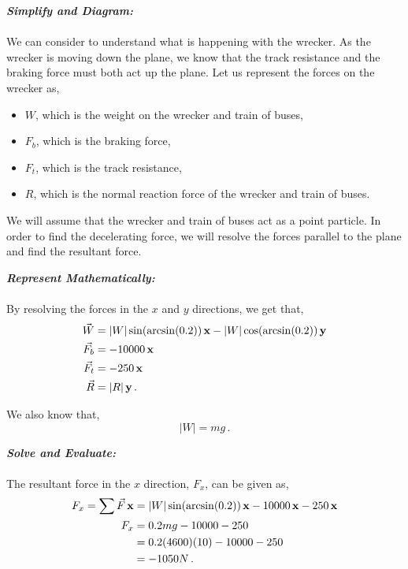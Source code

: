\begin{subquestions}
\begin{subsubquestions}
			\textbf{\textit{Simplify and Diagram:}} \\ \\
			We can consider  to understand what is happening with the wrecker. As the wrecker is moving down the plane, we know that the track resistance and the braking force must both act up the plane. Let us represent the forces on the wrecker as,
			\begin{itemize}
				\item $W$, which is the weight on the wrecker and train of buses,
				\item $F_b$, which is the braking force, 
				\item $F_t$, which is the track resistance,
				\item $R$, which is the normal reaction force of the wrecker and train of buses.
			\end{itemize}
			We will assume that the wrecker and train of buses act as a point particle. In order to find the decelerating force, we will resolve the forces parallel to the plane and find the resultant force.
			
			
			
			
			\textbf{\textit{Represent Mathematically:}} \\ \\
			By resolving the forces in the $x$ and $y$ directions, we get that,
			\begin{align}
				\vec{W} & = |W|\sin(\arcsin(0.2))\,\mathbf{x} - |W|\cos(\arcsin(0.2))\,\mathbf{y} \nonumber \\
				\vec{F_b} & = -10000\,\mathbf{x} \nonumber \\
				\vec{F_t} & = -250\,\mathbf{x} \nonumber \\
				\vec{R} & = |R|\,\mathbf{y} \,.
			\end{align}
			
			We also know that,
			\begin{equation}
				|W|=mg \,.
			\end{equation}
			
			
			
			
			\textbf{\textit{Solve and Evaluate:}} \\ \\
			The resultant force in the $x$ direction, $F_x$, can be given as,
			\begin{align}
				F_x = \sum \vec{F}\,\mathbf{x} & = |W|\sin(\arcsin(0.2))\,\mathbf{x} -10000\,\mathbf{x}-250\,\mathbf{x} \nonumber \\
				F_x & = 0.2mg -10000-250 \nonumber \\
				& = 0.2(4600)(10) -10000-250 \nonumber \\
				& = -1050 N \,.
			\end{align}
			

\end{subsubquestions}
\end{subquestions}
